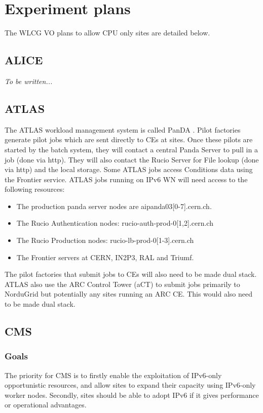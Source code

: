 \documentclass[11pt]{article}
\begin{document}
\section{Experiment plans}
The WLCG VO plans to allow CPU only sites are detailed below.  

\subsection{ALICE}
\emph{To be written...}

\subsection{ATLAS}
The ATLAS workload management system is called PanDA \cite{Panda}.  Pilot factories generate pilot jobs which are sent directly to CEs at sites.  Once these pilots are started by the batch system, they will contact a central Panda Server to pull in a job (done via http).  They will also contact the Rucio Server for File lookup (done via http) and the local storage.  Some ATLAS jobs access Conditions data using the Frontier service. ATLAS jobs running on IPv6 WN will need access to the following resources:
\begin{itemize}
\item The production panda server nodes are aipanda03[0-7].cern.ch.

\item The Rucio Authentication nodes: rucio-auth-prod-0[1,2].cern.ch

\item The Rucio Production nodes: rucio-lb-prod-0[1-3].cern.ch

\item The Frontier servers at CERN, IN2P3, RAL and Triumf.

\end{itemize}  

The pilot factories that submit jobs to CEs will also need to be made dual stack.  ATLAS also use the ARC Control Tower (aCT) to submit jobs primarily to NorduGrid but potentially any sites running an ARC CE.  This would also need to be made dual stack.


\subsection{CMS}
\subsubsection{Goals}
The priority for CMS is to firstly enable the exploitation of
IPv6-only opportunistic resources, and allow sites to expand their
capacity using IPv6-only worker nodes. Secondly, sites should be able
to adopt IPv6 if it gives performance or operational advantages.
\end{document}
